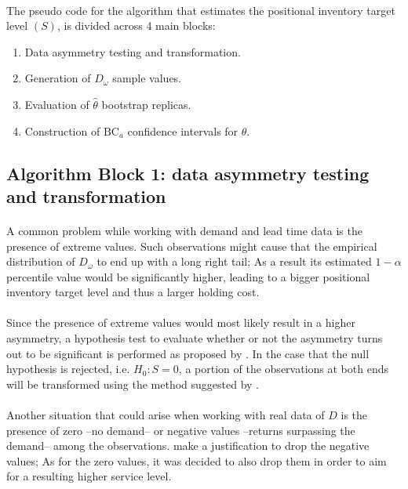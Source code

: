 \documentclass[letterpaper]{article}
\begin{document}
\paragraph{}
The pseudo code for the algorithm that estimates the positional inventory target level $(S)$, is divided across 4 main blocks:

\begin{enumerate}
	\item Data asymmetry testing and transformation.
	\item Generation of $D_\omega$ sample values.
	\item Evaluation of $\hat{\theta}$ bootstrap replicas.
	\item Construction of $\mathrm{BC}_a$ confidence intervals for $\theta$.
\end{enumerate}

\FloatBarrier


\subsection*{Algorithm Block 1: data asymmetry testing and transformation}
\paragraph{}
A common problem while working with demand and lead time data is the presence of extreme values. Such observations might cause that the empirical distribution of $D_\omega$ to end up with a long right tail; As a result its estimated  $1-\alpha$ percentile value would be significantly higher, leading to a bigger positional inventory target level and thus a larger holding cost.

\paragraph{}
Since the presence of extreme values would most likely result in a higher asymmetry, a hypothesis test to evaluate whether or not the asymmetry turns out to be significant is performed as proposed by  \cite{tabachnick2000using}. In the case that the null hypothesis is rejected, i.e. $H_0: S=0$, a portion of the observations at both ends will be transformed using the method suggested by \cite{singh1998breakdown}.

\paragraph{}
Another situation that could arise when working with real data of $D$ is the presence of zero --no demand-- or negative values --returns surpassing the demand-- among the observations. \cite{johansen2000r} make a justification to drop the negative values; As for the zero values, it was decided to also drop them in order to aim for a resulting higher service level.
\end{document}
